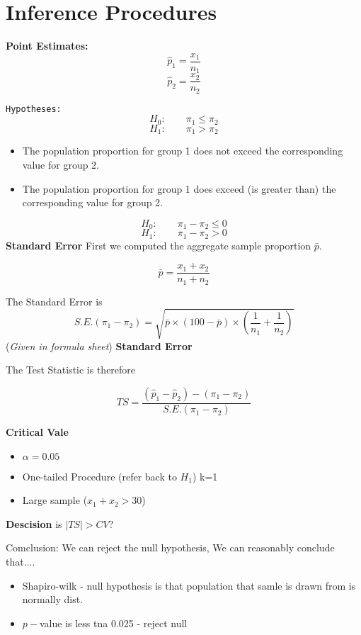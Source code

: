 \documentclass[12pt]{article}
\title{}
\author{}
\begin{document}
\section{Inference Procedures}
\textbf{Point Estimates:}
\[\hat{p}_1 = \frac{x_1}{n_1}  \]
\[\hat{p}_2 = \frac{x_2}{n_2}  \]

\texttt{Hypotheses:}
\[H_0 : \qquad \pi_1 \leq \pi_2   \]
\[H_1 : \qquad \pi_1 > \pi_2   \]

\begin{itemize}
\item The population proportion for group 1 does not exceed the corresponding value for group 2. 
\item The population proportion for group 1 does exceed (is greater than) the corresponding value for group 2.
\end{itemize}

\[H_0 : \qquad \pi_1 - \pi_2  \leq 0  \]
\[H_1 : \qquad \pi_1 - \pi_2 > 0   \]
\textbf{Standard Error}
First we computed the aggregate sample proportion $\bar{p}$.

\[\bar{p} = \frac{x_1 + x_2}{n_1 + n_2}\]

The Standard Error is 
\[ S.E.(\pi_1 - \pi_2) = \sqrt{\bar{p} \times (100-\bar{p}) \times \left(\frac{1}{n_1}+ \frac{1}{n_2} \right)}\]
(\textit{Given in formula sheet})
\textbf{Standard Error}

The Test Statistic is therefore 

\[ TS = \frac{(\hat{p}_1-\hat{p}_2)-(\pi_1 - \pi_2)}{S.E.(\pi_1 - \pi_2)}\]


\textbf{Critical Vale}
\begin{itemize}
\item $\alpha = 0.05$
\item One-tailed Procedure (refer back to $H_1$) k=1
\item Large sample ($x_1+x_2 > 30$)
\end{itemize}

\textbf{Descision}
is $|TS| > CV$?

Comclusion: We can reject the null hypothesis, We can reasonably conclude that....
\newpage

\begin{itemize}
\item Shapiro-wilk - null hypothesis is that population that samle is drawn from is normally dist.
\item $p-$value is less tna 0.025 - reject null
\end{itemize}
\end{document}
